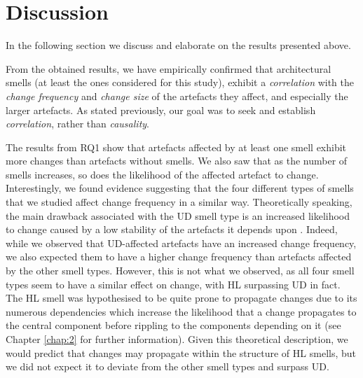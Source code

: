 \section{Discussion}\label{c5:sec:discussion}
In the following section we discuss and elaborate on the results presented above.

From the obtained results, we have empirically confirmed that architectural smells (at least the ones considered for this study), exhibit a \emph{correlation} with the \emph{change frequency} and \emph{change size} of the artefacts they affect, and especially the larger artefacts.
As stated previously, our goal was to seek and establish \emph{correlation}, rather than \emph{causality}.

The results from RQ1 show that artefacts affected by at least one smell exhibit more changes than artefacts without smells. We also saw that as the number of smells increases, so does the likelihood of the affected artefact to change. 
Interestingly, we found evidence suggesting that the four different types of smells that we studied affect change frequency in a similar way. 
Theoretically speaking, the main drawback associated with the UD smell type \cite{Arcelli2016} is an increased likelihood to change caused by a low stability of the artefacts it depends upon \cite{Martin2018}.
Indeed, while we observed that UD-affected artefacts have an increased change frequency, we also expected them to have a higher change frequency than artefacts affected by the other smell types. However, this is not what we observed, as all four smell types seem to have a similar effect on change, with HL surpassing UD in fact.
The HL smell was hypothesised to be quite prone to propagate changes due to its numerous dependencies which increase the likelihood that a change propagates to the central component before rippling to the components depending on it (see Chapter \ref{chap:2} for further information).
Given this theoretical description, we would predict that changes may propagate within the structure of HL smells, but we did not expect it to deviate from the other smell types and surpass UD.


